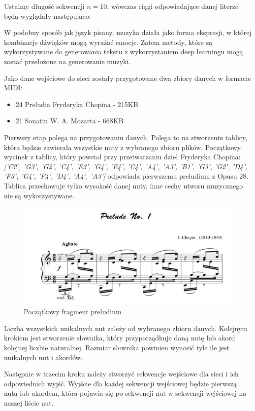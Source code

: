 	
	
	Ustalmy długość sekwencji $n=10$, wówczas ciągi odpowiadające danej literze będą wyglądały następująco:
	
	
	
	W podobny sposób jak język pisany, muzyka działa jako forma ekspresji, w której kombinacje dźwięków mogą wyrażać emocje. Zatem metody, które są wykorzystywane do generowania tekstu z wykorzystaniem deep learningu mogą zostać przełożone na generowanie muzyki. 
	
	Jako dane wejściowe do sieci zostały przygotowane dwa zbiory danych w formacie MIDI:
	\begin{itemize}
		\item 24 Preludia Fryderyka Chopina - 215KB
		\item 21 Sonatin W. A. Mozarta - 668KB
	\end{itemize}
	 Pierwszy etap polega na przygotowaniu danych. Polega to na stworzeniu tablicy, która będzie zawierała wszystkie nuty z wybranego zbioru plików. Początkowy wycinek z tablicy, który powstał przy przetwarzaniu dzieł Fryderyka Chopina: \textit{['C2', 'G3', 'G2', 'C4', 'E3', 'G4', 'E4', 'C4', 'A4', 'A3', 'B1', 'G3', 'G2', 'D4', 'F3', 'G4', 'F4', 'D4', 'A4', 'A3']} odpowiada pierwszemu preludium z Opusu 28. Tablica przechowuje tylko wysokość danej nuty, inne cechy utworu muzycznego nie są wykorzystywane.
	
	\begin{figure}[H]
		\centering
		\includegraphics[width=0.7\linewidth]{prelude_no_1}
		\caption{Początkowy fragment preludium}
		\label{fig:preludeno1}
	\end{figure}	
	Liczba wszystkich unikalnych nut zależy od wybranego zbioru danych. Kolejnym krokiem jest stworzenie słownika, który przyporządkuje daną nutę lub akord kolejnej liczbie naturalnej. Rozmiar słownika powinien wynosić tyle ile jest unikalnych nut i akordów.
	
	Następnie w trzecim kroku należy stworzyć sekwencje wejściowe dla sieci i ich odpowiednich wyjść. Wyjście dla każdej sekwencji wejściowej będzie pierwszą nutą lub akordem, która pojawia się po sekwencji nut w sekwencji wejściowej na naszej liście nut.
	
